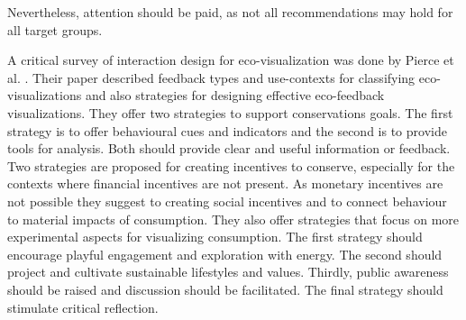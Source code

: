 Nevertheless, attention should be paid, as not all recommendations may hold for all target groups.

A critical survey of interaction design for eco-visualization was done by Pierce et al. \cite{pierce2008energy}. Their paper described feedback types and use-contexts for classifying eco-visualizations and also strategies for designing effective eco-feedback visualizations. They offer two strategies to support conservations goals. The first strategy is to offer behavioural cues and indicators and the second is to provide tools for analysis. Both should provide clear and useful information or feedback. Two strategies are proposed for creating incentives to conserve, especially for the contexts where financial incentives are not present. As monetary incentives are not possible they suggest to creating social incentives and to connect behaviour to material impacts of consumption. They also offer strategies that focus on more experimental aspects for visualizing consumption. The first strategy should encourage playful engagement and exploration with
energy. The second should project and cultivate sustainable lifestyles and
values. Thirdly, public awareness should be raised and discussion should be facilitated. The final strategy should stimulate critical reflection.

